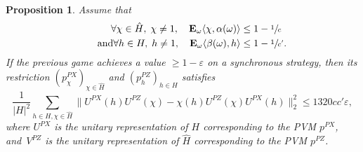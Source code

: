 \documentclass[10pt]{amsart}
\theoremstyle{plain}
\newtheorem{proposition}[theorem]{Proposition}
\theoremstyle{definition}
\newcommand{\E}{\mathbf{E}}
\begin{document}
\begin{proposition}\label{prop:construction_of_game} Assume that
\begin{align*}
\forall \chi \in \hat H,\;\chi\neq1,\quad \E_\omega \langle \chi, \alpha(\omega)\rangle &\leq 1-\sfrac 1 c
\\
\tag*{and}
\forall h \in H,\;h\neq1,\quad \E_\omega \langle \beta(\omega),h\rangle &\leq 1-\sfrac 1 {c'}.
\end{align*}
If the previous game achieves a value $\geq 1-\varepsilon$ on a synchronous strategy, then its restriction $(p^{PX}_\chi)_{\chi \in \hat H}$ and $(p^{PZ}_h)_{h \in H}$ satisfies
\[
\frac{1}{|H|^2} \sum_{h\in H,\chi \in \hat H}\bigl\|U^{PX}(h) U^{PZ}(\chi) - \chi(h) U^{PZ}(\chi) U^{PX}(h)\bigr\|_2^2 \leq 1320 cc' \varepsilon,
\]
where $U^{PX}$ is the unitary representation of $H$ corresponding to the PVM $p^{PX}$, and~$V^{PZ}$ is the unitary representation of $\hat H$ corresponding to the PVM $p^{PZ}$.
\end{proposition}
\end{document}
